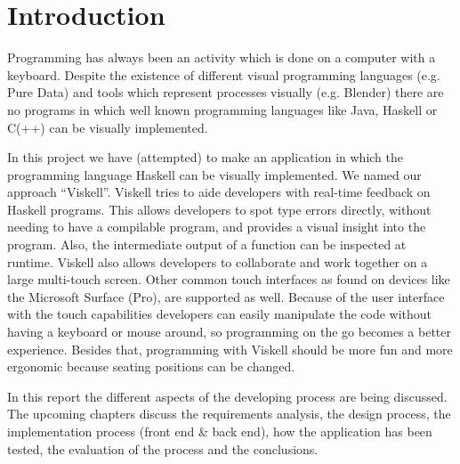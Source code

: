 \chapter{Introduction}

Programming has always been an activity which is done on a computer with a keyboard. Despite the existence of different visual programming languages (e.g. Pure Data) and tools which represent processes visually (e.g. Blender) there are no programs in which well known programming languages like Java, Haskell or C(++) can be visually implemented. 

In this project we have (attempted) to make an application in which the programming language Haskell can be visually implemented. We named our approach ``Viskell''. Viskell tries to aide developers with real-time feedback on Haskell programs. This allows developers to spot type errors directly, without needing to have a compilable program, and provides a visual insight into the program. Also, the intermediate output of a function can be inspected at runtime. Viskell also allows developers to collaborate and work together on a large multi-touch screen. Other common touch interfaces as found on devices like the Microsoft Surface (Pro), are supported as well. Because of the user interface with the touch capabilities developers can easily manipulate the code without having a keyboard or mouse around, so programming on the go becomes a better experience. Besides that, programming with Viskell should be more fun and more ergonomic because seating positions can be changed.

In this report the different aspects of the developing process are being discussed. The upcoming chapters discuss the requirements analysis, the design process, the implementation process (front end \& back end), how the application has been tested, the evaluation of the process and the conclusions.
